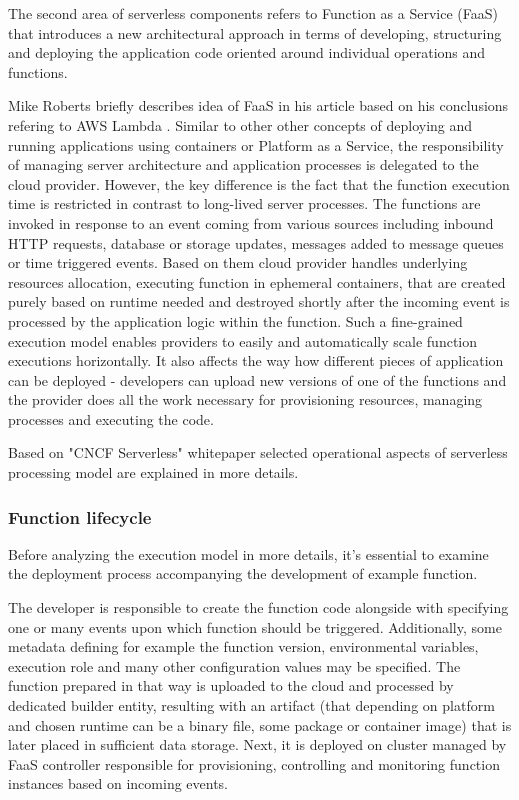 
The second area of serverless components refers to Function as a Service (FaaS) that introduces a new architectural approach in terms of developing, structuring and deploying the application code oriented around individual operations and functions.

Mike Roberts briefly describes idea of FaaS in his article \cite{MartinFowler} based on his conclusions refering to AWS Lambda \cite{AWSLambda}. 
Similar to other other concepts of deploying and running applications using containers or Platform as a Service, the responsibility of managing server architecture and application processes is delegated to the cloud provider. However, the key difference is the fact that the function execution time is restricted in contrast to long-lived server processes. 
The functions are invoked in response to an event coming from various sources including inbound HTTP requests, database or storage updates, messages added to message queues or time triggered events. 
Based on them cloud provider handles underlying resources allocation, executing function in ephemeral containers, that are created purely based on runtime needed and destroyed shortly after the incoming event is processed by the application logic within the function.
Such a fine-grained execution model enables providers to easily and automatically scale function executions horizontally. 
It also affects the way how different pieces of application can be deployed - developers can upload new versions of one of the functions and the provider does all the work necessary for provisioning resources, managing processes and executing the code.

Based on "CNCF Serverless" whitepaper \cite{CNCF} selected operational aspects of serverless processing model are explained in more details.

\subsubsection*{Function lifecycle}

Before analyzing the execution model in more details, it's essential to examine the deployment process accompanying the development of example function. 

The developer is responsible to create the function code alongside with specifying one or many events upon which function should be triggered. Additionally, some metadata defining for example the function version, environmental variables, execution role and many other configuration values may be specified. 
The function prepared in that way is uploaded to the cloud and processed by dedicated builder entity, resulting with an artifact (that depending on platform and chosen runtime can be a binary file, some package or container image) that is later placed in sufficient data storage. 
Next, it is deployed on cluster managed by FaaS controller responsible for provisioning, controlling and monitoring function instances based on incoming events. 

